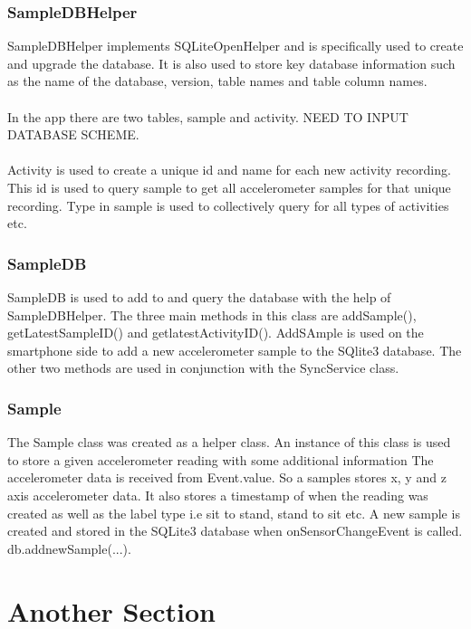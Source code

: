 \subsubsection{SampleDBHelper} %
\label{ssub:db_helper}
SampleDBHelper implements SQLiteOpenHelper and is specifically used to create and upgrade the database. It is also used to store key database information such as the name of the database, version, table names and table column names. 
\paragraph{}
In the app there are two tables, sample and activity. NEED TO INPUT DATABASE SCHEME.
\paragraph{}
Activity is used to create a unique id and name for each new activity recording. This id is used to query sample to get all accelerometer samples for that unique recording. Type in sample is used to collectively query for all types of activities etc.
\subsubsection{SampleDB} %
\label{ssub:db}
SampleDB is used to add to and query the database with the help of SampleDBHelper. The three main methods in this class are addSample(), getLatestSampleID() and getlatestActivityID(). AddSAmple is used on the smartphone side to add a new accelerometer sample to the SQlite3 database. The other two methods are used in conjunction with the SyncService class.
\subsubsection{Sample} %
\label{ssub:sample}
The Sample class was created as a helper class. An instance of this class is used to store a given accelerometer reading with some additional information The accelerometer data is received from Event.value. So a samples stores x, y and z axis accelerometer data. It also stores a timestamp of when the reading was created as well as the label type i.e sit to stand, stand to sit etc. A new sample is created and stored in the SQLite3 database when onSensorChangeEvent is called. db.addnewSample(...).
\section{Another Section} %
\label{sec:another_section}

